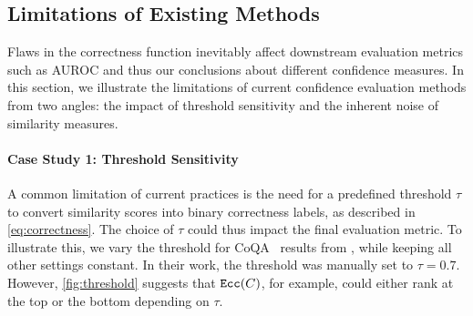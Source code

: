 

\subsection{Limitations of Existing Methods}
\label{subsecton:limitations}


Flaws in the correctness function inevitably affect downstream evaluation metrics such as AUROC and thus our conclusions about different confidence measures. %
In this section, we illustrate the limitations of current confidence evaluation methods from two angles: the impact of threshold sensitivity and the inherent noise of similarity measures.

\paragraph{Case Study 1: Threshold Sensitivity}

A common limitation of current practices is the need for a predefined threshold $\tau$ to convert similarity scores into binary correctness labels, as described in \cref{eq:correctness}. 
The choice of $\tau$ could thus impact the final evaluation metric.
To illustrate this, we vary the threshold for CoQA~\cite{CoQA} results from \citet{lin2024generating}, while keeping all other settings constant.
In their work, the threshold was manually set to $\tau=0.7$. 
However, \cref{fig:threshold} suggests that $\texttt{Ecc}(C)$, for example, could either rank at the top or the bottom depending on $\tau$.

